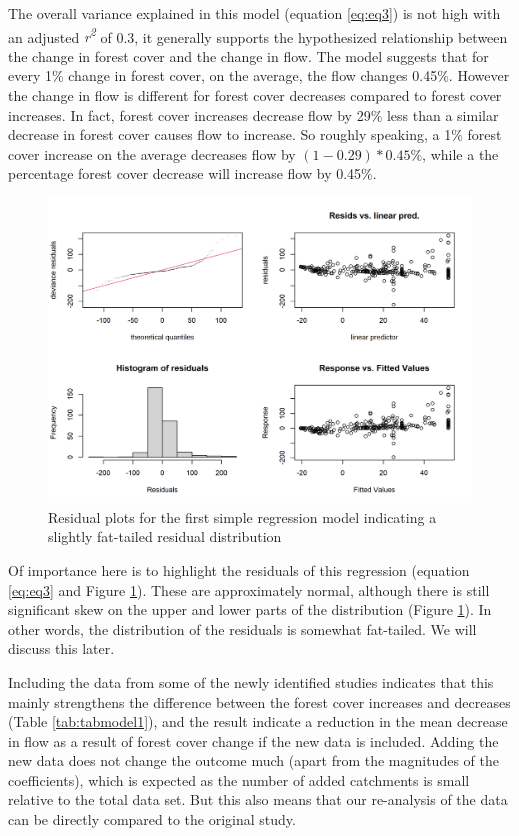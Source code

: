\documentclass[]{elsarticle} %
\begin{document}
The overall variance explained in this model (equation \eqref{eq:eq3}) is not high with an adjusted \emph{r\textsuperscript{2}} of 0.3, it generally supports the hypothesized relationship between the change in forest cover and the change in flow. The model suggests that for every 1\% change in forest cover, on the average, the flow changes 0.45\%. However the change in flow is different for forest cover decreases compared to forest cover increases. In fact, forest cover increases decrease flow by 29\% less than a similar decrease in forest cover causes flow to increase. So roughly speaking, a 1\% forest cover increase on the average decreases flow by \((1 - 0.29)*0.45\%\), while a the percentage forest cover decrease will increase flow by 0.45\%.

\begin{figure}
\includegraphics[width=0.9\linewidth]{residual_plot_model1} \caption{Residual plots for the first simple regression model indicating a slightly fat-tailed residual distribution}\label{fig:gamcheck}
\end{figure}

Of importance here is to highlight the residuals of this regression (equation \eqref{eq:eq3} and Figure \ref{fig:gamcheck}). These are approximately normal, although there is still significant skew on the upper and lower parts of the distribution (Figure \ref{fig:gamcheck}). In other words, the distribution of the residuals is somewhat fat-tailed. We will discuss this later.

Including the data from some of the newly identified studies indicates that this mainly strengthens the difference between the forest cover increases and decreases (Table \ref{tab:tabmodel1}), and the result indicate a reduction in the mean decrease in flow as a result of forest cover change if the new data is included. Adding the new data does not change the outcome much (apart from the magnitudes of the coefficients), which is expected as the number of added catchments is small relative to the total \citet{zhang2017} data set. But this also means that our re-analysis of the data can be directly compared to the original study.
\end{document}

